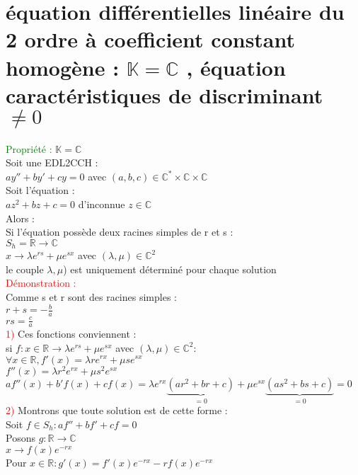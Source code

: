 \documentclass{article}
\begin{document}
	\section{équation différentielles linéaire du 2 ordre à coefficient constant homogène : $\mathbb{K} = \mathbb{C}$ , équation caractéristiques de discriminant $\neq 0$}
	\textcolor{green}{Propriété :} $\mathbb{K} =\mathbb{C}$ \\ 
	Soit une EDL2CCH : \\ 
	$ay''+by'+cy=0$ avec $(a,b,c) \in \mathbb{C}^* \times \mathbb{C} \times \mathbb{C}$ \\ 
	Soit l'équation : \\ 
	$az^2+bz+c=0$ d'inconnue $z \in \mathbb{C}$ \\ 
	Alors : \\ 
	Si l'équation possède deux racines simples de r et s : \\ 
	$S_h= \mathbb{R} \rightarrow \mathbb{C}$ \\ 
	\indent $x \rightarrow \lambda e^{rs}+\mu e^{sx}$ avec $(\lambda,\mu)\in \mathbb{C}^2$ \\ 
	le couple $\lambda,\mu$) est uniquement déterminé pour chaque solution \\ 
	\textcolor{red}{Démonstration :} \\ 
	Comme s et r sont des racines simples : \\ 
	$r+s=-\frac{b}{a}$ \\ 
	$rs=\frac{c}{a}$ \\
	\textcolor{red}{1)} Ces fonctions conviennent : \\ 
	si $f:x \in \mathbb{R} \rightarrow \lambda e^{rs}+\mu e^{sx}$ avec $(\lambda,\mu) \in \mathbb{C}^2$: \\ 
	$\forall x \in \mathbb{R}, f'(x)=\lambda r e^{rx}+\mu s e^{sx}$ \\ 
	\indent $f''(x)=\lambda r^2e^{rx}+\mu s^2 e^{sx}$ \\ 
	$af''(x)+b'f(x)+cf(x)=\lambda e^{rx}\underbrace{(ar^2+br+c)}_{=0}+ \mu e^{sx}\underbrace{(as^2+bs+c)}_{=0}=0$ \\ 
	\textcolor{red}{2)} Montrons que toute solution est de cette forme : \\ 
	Soit $f \in S_h :af''+bf'+cf=0$ \\ 
	Posons $g : \mathbb{R} \rightarrow \mathbb{C}$ \\ 
	\indent $x \rightarrow f(x)e^{-rx}$ \\ 
	Pour $x \in \mathbb{R}:g'(x)=f'(x)e^{-rx}-rf(x)e^{-rx}$ \\ 
\end{document}
